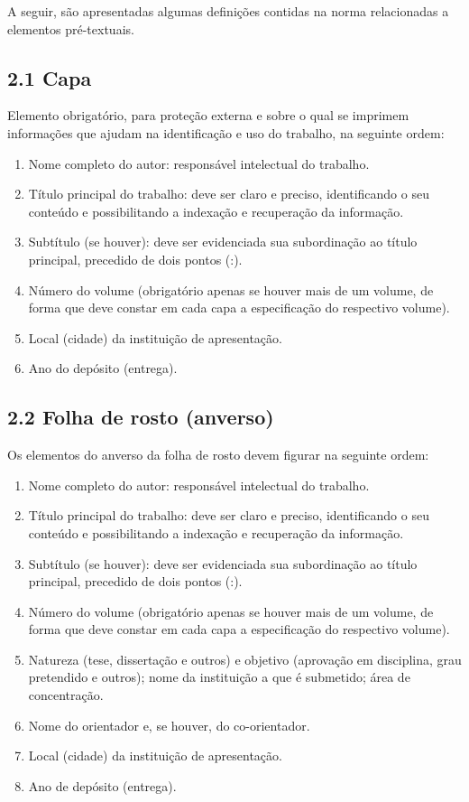 \documentclass[
	12pt,				%
	oneside,			%
	a4paper,			%
	english,			%
	brazil				%
	]{abntex2ppgsi}
\begin{document}
\begin{anexosenv}
A seguir, são apresentadas algumas definições contidas na norma relacionadas a elementos pré-textuais.

\subsection*{2.1 Capa}

Elemento obrigatório, para proteção externa e sobre o qual se imprimem informações que ajudam na identificação e uso do trabalho, na seguinte ordem:
\begin{enumerate}
	\item Nome completo do autor: responsável intelectual do trabalho.
	\item	Título principal do trabalho: deve ser claro e preciso, identificando o seu conteúdo e possibilitando a indexação e recuperação da informação.
	\item	Subtítulo (se houver): deve ser evidenciada sua subordinação ao título principal, precedido de dois pontos (:).
	\item	Número do volume (obrigatório apenas se houver mais de um volume, de forma que deve constar em cada capa a especificação do respectivo volume).
	\item	Local (cidade) da instituição de apresentação.
	\item	Ano do depósito (entrega).
\end{enumerate}

\subsection*{2.2 Folha de rosto (anverso)}

Os elementos do anverso da folha de rosto devem figurar na seguinte ordem:
\begin{enumerate}
	\item	Nome completo do autor: responsável intelectual do trabalho.
	\item	Título principal do trabalho: deve ser claro e preciso, identificando o seu conteúdo e possibilitando a indexação e recuperação da informação.
	\item	Subtítulo (se houver): deve ser evidenciada sua subordinação ao título principal, precedido de dois pontos (:).
	\item	Número do volume (obrigatório apenas se houver mais de um volume, de forma que deve constar em cada capa a especificação do respectivo volume).
	\item	Natureza (tese, dissertação e outros) e objetivo (aprovação em disciplina, grau pretendido e outros); nome da instituição a que é submetido; área de concentração.
	\item	Nome do orientador e, se houver, do co-orientador.
	\item	Local (cidade) da instituição de apresentação.
	\item	Ano de depósito (entrega).
\end{enumerate}


\end{anexosenv}
\end{document}
